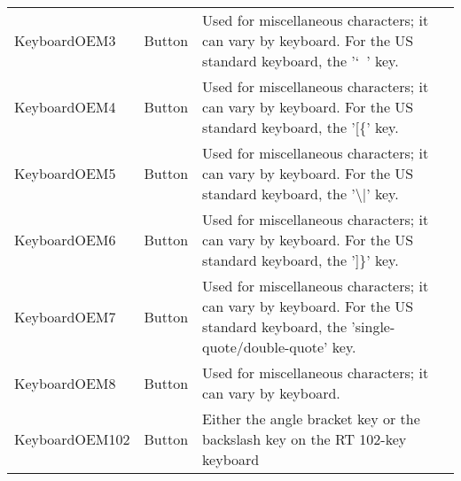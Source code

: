 \begin{center}
\begin{longtable}{ | l | l | p{9cm} |}
	KeyboardOEM3				&	Button	&	Used for miscellaneous characters; it can vary by keyboard. For the US standard keyboard, the '`~' key.\\
	KeyboardOEM4				&	Button	&	Used for miscellaneous characters; it can vary by keyboard. For the US standard keyboard, the '[\{' key.\\
	KeyboardOEM5				&	Button	&	Used for miscellaneous characters; it can vary by keyboard. For the US standard keyboard, the '\textbackslash |' key.\\
	KeyboardOEM6				&	Button	&	Used for miscellaneous characters; it can vary by keyboard. For the US standard keyboard, the ']\}' key.\\
	KeyboardOEM7				&	Button	&	Used for miscellaneous characters; it can vary by keyboard. For the US standard keyboard, the 'single-quote/double-quote' key.\\
	KeyboardOEM8				&	Button	&	Used for miscellaneous characters; it can vary by keyboard.\\
	KeyboardOEM102				&	Button	&	Either the angle bracket key or the backslash key on the RT 102-key keyboard\\
	\hline
	\end{longtable}
\end{center}


